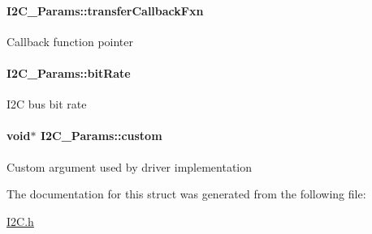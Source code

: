 \paragraph[{transfer\+Callback\+Fxn}]{ I2\+C\+\_\+\+Params\+::transfer\+Callback\+Fxn}\label{struct_i2_c___params_a57edf1b900368904779d0c57a73cf047}
Callback function pointer 
\paragraph[{bit\+Rate}]{ I2\+C\+\_\+\+Params\+::bit\+Rate}\label{struct_i2_c___params_ad31857f6dbedb77c60c92cc8cd8cde0c}
I2\+C bus bit rate 
\paragraph[{custom}]{\setlength{\rightskip}{0pt plus 5cm}void$\ast$ I2\+C\+\_\+\+Params\+::custom}\label{struct_i2_c___params_a2416cc06d853e6cc24e1f294dfebb194}
Custom argument used by driver implementation 

The documentation for this struct was generated from the following file\+:\begin{DoxyCompactItemize}
\item 
\hyperlink{_i2_c_8h}{I2\+C.\+h}\end{DoxyCompactItemize}
